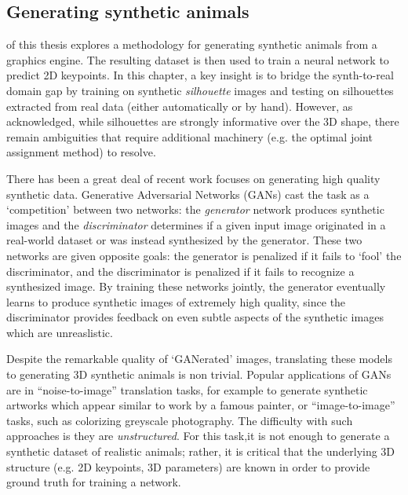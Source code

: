 
\subsection{Generating synthetic animals}

 of this thesis explores a methodology for generating synthetic animals from a graphics engine. The resulting dataset is then used to train a neural network to predict 2D keypoints. In this chapter, a key insight is to bridge the synth-to-real domain gap by training on synthetic \emph{silhouette} images and testing on silhouettes extracted from real data (either automatically or by hand). However, as acknowledged, while silhouettes are strongly informative over the 3D shape, there remain ambiguities that require additional machinery (e.g. the optimal joint assignment method) to resolve.

There has been a great deal of recent work focuses on generating high quality synthetic data. Generative Adversarial Networks (GANs) cast the task as a `competition' between two networks: the \emph{generator} network produces synthetic images and the \emph{discriminator} determines if a given input image originated in a real-world dataset or was instead synthesized by the generator. These two networks are given opposite goals: the generator is penalized if it fails to `fool' the discriminator, and the discriminator is penalized if it fails to recognize a synthesized image. By training these networks jointly, the generator eventually learns to produce synthetic images of extremely high quality, since the discriminator provides feedback on even subtle aspects of the synthetic images which are unreaslistic. 

Despite the remarkable quality of `GANerated' images, translating these models to generating 3D synthetic animals is non trivial. Popular applications of GANs are in ``noise-to-image'' translation tasks, for example to generate synthetic artworks which appear similar to work by a famous painter, or ``image-to-image'' tasks, such as colorizing greyscale photography. The difficulty with such approaches is they are \emph{unstructured}. For this task,it is not enough to generate a synthetic dataset of realistic animals; rather, it is critical that the underlying 3D structure (e.g. 2D keypoints, 3D parameters) are known in order to provide ground truth for training a network. 

